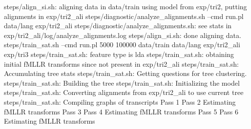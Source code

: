 steps/align_si.sh: aligning data in data/train using model from exp/tri2, putting alignments in exp/tri2_ali
steps/diagnostic/analyze_alignments.sh --cmd run.pl data/lang exp/tri2_ali
steps/diagnostic/analyze_alignments.sh: see stats in exp/tri2_ali/log/analyze_alignments.log
steps/align_si.sh: done aligning data.
steps/train_sat.sh --cmd run.pl 5000 100000 data/train data/lang exp/tri2_ali exp/tri3
steps/train_sat.sh: feature type is lda
steps/train_sat.sh: obtaining initial fMLLR transforms since not present in exp/tri2_ali
steps/train_sat.sh: Accumulating tree stats
steps/train_sat.sh: Getting questions for tree clustering.
steps/train_sat.sh: Building the tree
steps/train_sat.sh: Initializing the model
steps/train_sat.sh: Converting alignments from exp/tri2_ali to use current tree
steps/train_sat.sh: Compiling graphs of transcripts
Pass 1
Pass 2
Estimating fMLLR transforms
Pass 3
Pass 4
Estimating fMLLR transforms
Pass 5
Pass 6
Estimating fMLLR transforms


